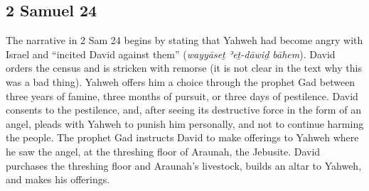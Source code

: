 \hypertarget{samuel-24}{%
\subsection{2 Samuel 24}\label{samuel-24}}

The narrative in 2 Sam 24 begins by stating that Yahweh had become angry
with Israel and ``incited David against them'' (\emph{wayyāseṯ ʾeṯ-dāwiḏ
bāhem}). David orders the census and is stricken with remorse (it is not
clear in the text why this was a bad thing). Yahweh offers him a choice
through the prophet Gad between three years of famine, three months of
pursuit, or three days of pestilence. David consents to the pestilence,
and, after seeing its destructive force in the form of an angel, pleads
with Yahweh to punish him personally, and not to continue harming the
people. The prophet Gad instructs David to make offerings to Yahweh
where he saw the angel, at the threshing floor of Araunah, the Jebusite.
David purchases the threshing floor and Araunah's livestock, builds an
altar to Yahweh, and makes his offerings.

